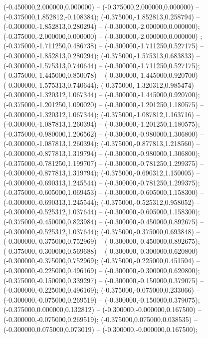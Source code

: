  (-0.450000,2.000000,0.000000) -- (-0.375000,2.000000,0.000000) -- (-0.375000,1.852812,-0.108384);
 (-0.375000,-1.852813,0.258794) -- (-0.300000,-1.852813,0.280294) -- (-0.300000,-2.000000,0.000000);
 (-0.375000,-2.000000,0.000000) -- (-0.300000,-2.000000,0.000000) ;
 (-0.375000,-1.711250,0.486738) -- (-0.300000,-1.711250,0.527175) -- (-0.300000,-1.852813,0.280294);
 (-0.375000,-1.575313,0.683833) -- (-0.300000,-1.575313,0.740644) -- (-0.300000,-1.711250,0.527175);
 (-0.375000,-1.445000,0.850078) -- (-0.300000,-1.445000,0.920700) -- (-0.300000,-1.575313,0.740644);
 (-0.375000,-1.320312,0.985474) -- (-0.300000,-1.320312,1.067344) -- (-0.300000,-1.445000,0.920700);
 (-0.375000,-1.201250,1.090020) -- (-0.300000,-1.201250,1.180575) -- (-0.300000,-1.320312,1.067344);
 (-0.375000,-1.087812,1.163716) -- (-0.300000,-1.087813,1.260394) -- (-0.300000,-1.201250,1.180575);
 (-0.375000,-0.980000,1.206562) -- (-0.300000,-0.980000,1.306800) -- (-0.300000,-1.087813,1.260394);
 (-0.375000,-0.877813,1.218560) -- (-0.300000,-0.877813,1.319794) -- (-0.300000,-0.980000,1.306800);
 (-0.375000,-0.781250,1.199707) -- (-0.300000,-0.781250,1.299375) -- (-0.300000,-0.877813,1.319794);
 (-0.375000,-0.690312,1.150005) -- (-0.300000,-0.690313,1.245544) -- (-0.300000,-0.781250,1.299375);
 (-0.375000,-0.605000,1.069453) -- (-0.300000,-0.605000,1.158300) -- (-0.300000,-0.690313,1.245544);
 (-0.375000,-0.525312,0.958052) -- (-0.300000,-0.525312,1.037644) -- (-0.300000,-0.605000,1.158300);
 (-0.375000,-0.450000,0.823984) -- (-0.300000,-0.450000,0.892675) -- (-0.300000,-0.525312,1.037644);
 (-0.375000,-0.375000,0.693848) -- (-0.300000,-0.375000,0.752969) -- (-0.300000,-0.450000,0.892675);
 (-0.375000,-0.300000,0.569688) -- (-0.300000,-0.300000,0.620800) -- (-0.300000,-0.375000,0.752969);
 (-0.375000,-0.225000,0.451504) -- (-0.300000,-0.225000,0.496169) -- (-0.300000,-0.300000,0.620800);
 (-0.375000,-0.150000,0.339297) -- (-0.300000,-0.150000,0.379075) -- (-0.300000,-0.225000,0.496169);
 (-0.375000,-0.075000,0.233066) -- (-0.300000,-0.075000,0.269519) -- (-0.300000,-0.150000,0.379075);
 (-0.375000,0.000000,0.132812) -- (-0.300000,-0.000000,0.167500) -- (-0.300000,-0.075000,0.269519);
 (-0.375000,0.075000,0.038535) -- (-0.300000,0.075000,0.073019) -- (-0.300000,-0.000000,0.167500);
